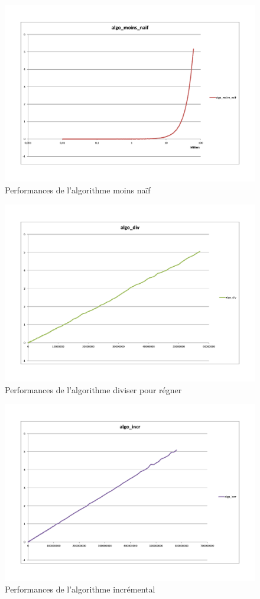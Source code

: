 \documentclass[11pt, a4paper]{article}
\begin{document}
\begin{figure}[h]
\includegraphics [scale=0.5]{images/algo_moins_naif.png}
\caption{Performances de l'algorithme moins naïf}
\end{figure}

\begin{figure}[h]
\includegraphics [scale=0.5]{images/algo_div.png}
\caption{Performances de l'algorithme diviser pour régner}
\end{figure}

\begin{figure}[h]
\includegraphics [scale=0.5]{images/algo_incr.png}
\caption{Performances de l'algorithme incrémental}
\end{figure}
\end{document}
